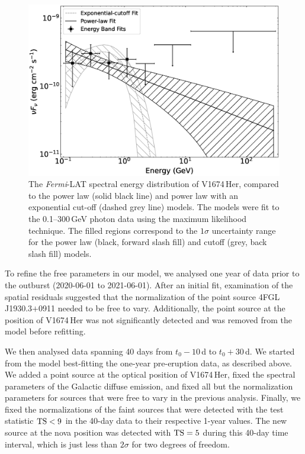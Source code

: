 \documentclass[a4paper,fleqn,usenatbib]{mnras}
\newcommand{\nova}{V1674\,Her}
\newcommand{\fermilat}{\emph{Fermi}-LAT}
\begin{document}
\begin{figure}
\includegraphics[width=1.0\linewidth,clip=true,trim=0.4cm 0.5cm 2.5cm 2.0cm,angle=0]{NovaHer2021_LATspec_multipleFits_v2.eps}
\caption{The \fermilat{} spectral energy distribution of \nova{}, compared to the power law
(solid black line) and power law with an exponential cut-off (dashed grey line) models. The models were fit to the 0.1--300\,GeV photon data using the maximum likelihood technique. 
The filled regions correspond to the $1\sigma$ uncertainty range for the power law (black, forward slash fill) and cutoff (grey, back slash fill) models.} 
    \label{fig:latspec}
\end{figure}

To refine the free parameters in our model, 
we analysed one year of data prior to the outburst (2020-06-01 to 2021-06-01). 
After an initial fit, examination of the spatial residuals suggested that the normalization of the point source 4FGL\,J1930.3$+$0911 needed to be free to vary. 
Additionally, the point source at the position of \nova{} was not significantly detected and was removed from the model before refitting.

We then analysed data spanning 40 days from $t_0-10$\,d to $t_0+30$\,d. 
We started from the model best-fitting the one-year pre-eruption data, as described above.
We added a point source at the optical position of \nova{}, 
fixed the spectral parameters of the Galactic diffuse emission, 
and fixed all but the normalization parameters for sources that were free to vary in the previous analysis.
Finally, we fixed the normalizations of the faint sources that were detected with 
the test statistic ${\rm TS}<9$ \citep{1996ApJ...461..396M} in the 40-day data to their respective 1-year values.
The new source at the nova position was detected with 
${\rm TS}=5$ during this 40-day time interval, which is just less than $2\sigma$ for two degrees of freedom.
\end{document}
